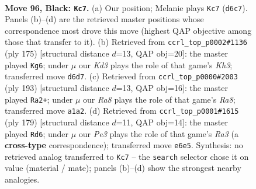 \documentclass[11pt]{article}
\begin{document}
\clearpage

\begin{figure}[p]\centering
\begin{subfigure}{0.46\textwidth}\centering
\resizebox{\linewidth}{!}{%
\newchessgame
\chessboard[
  setfen={1R6/8/3kpp1R/8/4P3/5PK1/8/r7 b - - 5 96},
  showmover=false,
  pgfstyle=straightmove, color=movearrow, markmove={d6-c7}
]}
\caption{}
\end{subfigure}\hfill
\begin{subfigure}{0.46\textwidth}\centering
\resizebox{\linewidth}{!}{%
\newchessgame
\chessboard[
  setfen={8/8/r6k/4R1p1/6P1/5P2/5K2/8 b - - 76 88},
  showmover=false,
  pgfstyle=straightmove, color=movearrow, markmove={h6-g6}
]}
\caption{}
\end{subfigure}
\\[4pt]
\begin{subfigure}{0.46\textwidth}\centering
\resizebox{\linewidth}{!}{%
\newchessgame
\chessboard[
  setfen={8/5k2/8/2R2p2/5P2/4P3/5K2/r7 b - - 72 97},
  showmover=false,
  pgfstyle=straightmove, color=movearrow, markmove={a1-a2}
]}
\caption{}
\end{subfigure}\hfill
\begin{subfigure}{0.46\textwidth}\centering
\resizebox{\linewidth}{!}{%
\newchessgame
\chessboard[
  setfen={8/5R2/r4p1k/5P2/4P3/4K3/8/8 b - - 16 90},
  showmover=false,
  pgfstyle=straightmove, color=movearrow, markmove={a6-d6}
]}
\caption{}
\end{subfigure}
\caption{\textbf{Move 96, Black: \texttt{Kc7}.} (a) Our position; Melanie plays \texttt{Kc7} (\texttt{d6c7}). Panels (b)--(d) are the retrieved master positions whose correspondence most drove this move (highest QAP objective among those that transfer to it). (b) Retrieved from \texttt{ccrl\_top\_p0002\#1136} (ply 175) [structural distance $d$=13, QAP obj=20]: the master played \texttt{Kg6}; under $\mu$ our \emph{Kd3} plays the role of that game's \emph{Kh3}; transferred move \texttt{d6d7}. (c) Retrieved from \texttt{ccrl\_top\_p0000\#2003} (ply 193) [structural distance $d$=13, QAP obj=16]: the master played \texttt{Ra2+}; under $\mu$ our \emph{Ra8} plays the role of that game's \emph{Ra8}; transferred move \texttt{a1a2}. (d) Retrieved from \texttt{ccrl\_top\_p0001\#1615} (ply 179) [structural distance $d$=11, QAP obj=14]: the master played \texttt{Rd6}; under $\mu$ our \emph{Pe3} plays the role of that game's \emph{Ra3} (a \textbf{cross-type} correspondence); transferred move \texttt{e6e5}. Synthesis: no retrieved analog transferred to \texttt{Kc7} -- the \texttt{search} selector chose it on value (material / mate); panels (b)--(d) show the strongest nearby analogies.}
\label{fig:thought-m191}
\end{figure}
\end{document}
